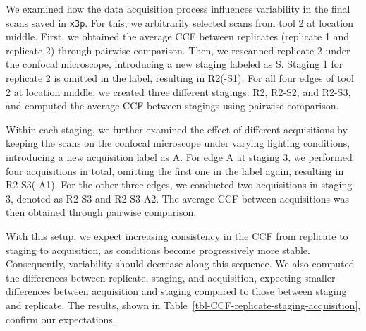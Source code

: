 \documentclass[fleqn,10pt]{wlscirep}
\begin{document}
We examined how the data acquisition process influences variability in
the final scans saved in \texttt{x3p}. For this, we arbitrarily selected
scans from tool 2 at location middle. First, we obtained the average CCF
between replicates (replicate 1 and replicate 2) through pairwise
comparison. Then, we rescanned replicate 2 under the confocal
microscope, introducing a new staging labeled as S. Staging 1 for
replicate 2 is omitted in the label, resulting in R2(-S1). For all four
edges of tool 2 at location middle, we created three different stagings:
R2, R2-S2, and R2-S3, and computed the average CCF between stagings
using pairwise comparison.

Within each staging, we further examined the effect of different
acquisitions by keeping the scans on the confocal microscope under
varying lighting conditions, introducing a new acquisition label as A.
For edge A at staging 3, we performed four acquisitions in total,
omitting the first one in the label again, resulting in R2-S3(-A1). For
the other three edges, we conducted two acquisitions in staging 3,
denoted as R2-S3 and R2-S3-A2. The average CCF between acquisitions was
then obtained through pairwise comparison.

With this setup, we expect increasing consistency in the CCF from
replicate to staging to acquisition, as conditions become progressively
more stable. Consequently, variability should decrease along this
sequence. We also computed the differences between replicate, staging,
and acquisition, expecting smaller differences between acquisition and
staging compared to those between staging and replicate. The results,
shown in Table~\ref{tbl-CCF-replicate-staging-acquisition}, confirm our
expectations.
\end{document}
